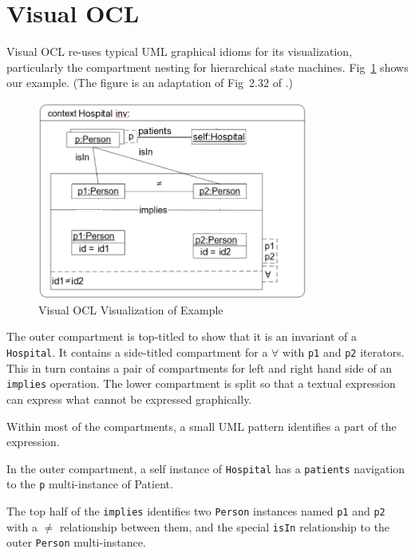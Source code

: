 \documentclass{llncs}
\begin{document}
\section{Visual OCL}\label{Visual OCL}

Visual OCL re-uses typical UML graphical idioms for its visualization, particularly the compartment nesting for hierarchical state machines. Fig~\ref{Visual OCL} shows our example. (The figure is an adaptation of Fig~2.32 of \cite{Visual-OCL}.)

\begin{figure}
	\vspace{-10pt}
	\begin{center}
		\includegraphics[width=3.5in]{VisualOCLinv.png}
	\end{center}
	\vspace{-10pt}
	\caption{Visual OCL Visualization of Example}
	\label{fig:VisualOCL}
	\vspace{-10pt}
\end{figure}

The outer compartment is top-titled to show that it is an invariant of a \verb$Hospital$. It contains a side-titled compartment for a $\forall$ with \verb$p1$ and \verb$p2$ iterators. This in turn contains a pair of compartments for left and right hand side of an \verb$implies$ operation. The lower compartment is split so that a textual expression can express what cannot be expressed graphically.

Within most of the compartments, a small UML pattern identifies a part of the expression.

In the outer compartment, a self instance of \verb$Hospital$ has a \verb$patients$ navigation to the \verb$p$ multi-instance of Patient.

The top half of the \verb$implies$ identifies two \verb$Person$ instances named \verb$p1$ and \verb$p2$ with a $\neq$ relationship between them, and the special \verb$isIn$ relationship to the outer \verb$Person$ multi-instance.
\end{document}
